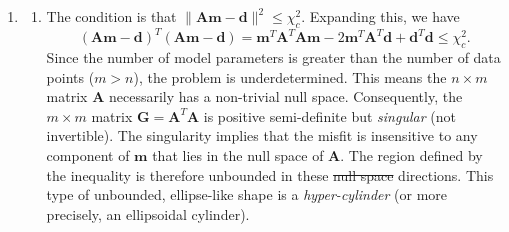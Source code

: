 \documentclass[a4paper,10pt]{paper}
\providecommand{\DIFadd}[1]{{\protect\color{blue}\uwave{#1}}} %
\providecommand{\DIFdel}[1]{{\protect\color{red}\sout{#1}}}                      %
\providecommand{\DIFaddbegin}{} %
\providecommand{\DIFaddend}{} %
\providecommand{\DIFdelbegin}{} %
\providecommand{\DIFdelend}{} %
\begin{document}
\begin{enumerate}
\item
\begin{enumerate}
    \item The condition is that $\|\mathbf{A}\mathbf{m}-\mathbf{d}\|^{2} \le \chi^{2}_{c}$. Expanding this, we have
    \begin{equation*}
        (\mathbf{A}\mathbf{m}-\mathbf{d})^{T}(\mathbf{A}\mathbf{m}-\mathbf{d}) = \mathbf{m}^{T}\mathbf{A}^{T}\mathbf{A}\mathbf{m}-2\mathbf{m}^{T}\mathbf{A}^{T}\mathbf{d}+\mathbf{d}^{T}\mathbf{d} \le \chi_{c}^{2}.
    \end{equation*}
    Since the number of model parameters is greater than the number of data points ($m>n$), the problem is underdetermined. This means the $n \times m$ matrix $\mathbf{A}$ necessarily has a non-trivial null space.
     Consequently, the $m \times m$ matrix $\mathbf{G} = \mathbf{A}^{T}\mathbf{A}$ is positive semi-definite but \emph{singular} (not invertible). The singularity implies that the misfit is insensitive to any component
     of $\mathbf{m}$ that lies in the null space of $\mathbf{A}$. The region defined by the inequality is therefore unbounded in these \DIFdelbegin \DIFdel{null space }\DIFdelend \DIFaddbegin \DIFadd{null-space }\DIFaddend directions. This type of unbounded, ellipse-like shape is a
     \emph{hyper-cylinder} (or more precisely, an ellipsoidal cylinder).


\end{enumerate}
\end{enumerate}
\end{document}
